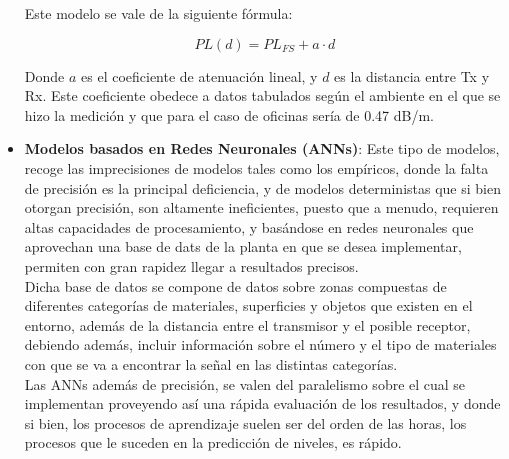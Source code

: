 \begin{itemize}
{Este modelo se vale de la siguiente fórmula:

\begin{equation}
PL(d) =  PL_{FS} + a\cdot{d}
\end{equation}

Donde $a$ es el coeficiente de atenuación lineal, y $d$ es la distancia entre Tx y Rx. Este coeficiente obedece a datos tabulados según el ambiente en el que se hizo la medición y que para el caso de oficinas sería de 0.47 dB/m. 
}

\item{\textbf{Modelos basados en Redes Neuronales (ANNs)}: Este tipo de modelos, recoge las imprecisiones de modelos tales como los empíricos, donde la falta de precisión es la principal deficiencia, y de modelos deterministas que si bien otorgan precisión, son altamente ineficientes, puesto que a menudo, requieren altas capacidades de procesamiento, y basándose en redes neuronales que aprovechan una base de dats de la planta en que se desea implementar, permiten con gran rapidez llegar a resultados precisos. \\

Dicha base de datos se compone de datos sobre zonas compuestas de diferentes categorías de materiales, superficies y objetos que existen en el entorno, además de la distancia entre el transmisor y el posible receptor, debiendo además, incluir información sobre el número y el tipo de materiales con que se va a encontrar la señal en las distintas categorías.\\

Las ANNs además de precisión, se valen del paralelismo sobre el cual se implementan proveyendo así una rápida evaluación de los resultados, y donde si bien, los procesos de aprendizaje suelen ser del orden de las horas, los procesos que le suceden en la predicción de niveles, es rápido.
}
\end{itemize}